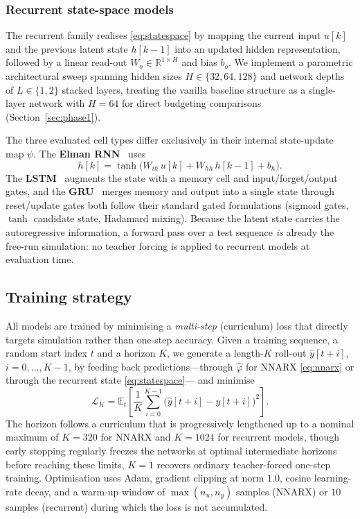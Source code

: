 \documentclass[10pt,twocolumn,letterpaper]{article}
\begin{document}
\subsubsection{Recurrent state-space models}
The recurrent family realises \eqref{eq:statespace} by mapping the current input 
$u[k]$ and the previous latent state $h[k-1]$ into an updated hidden representation, 
followed by a linear read-out $W_o \in \mathbb{R}^{1 \times H}$ and bias $b_o$. 
We implement a parametric architectural sweep 
spanning hidden sizes $H \in \{32, 64, 128\}$ and network depths of $L \in \{1, 2\}$ 
stacked layers, treating the vanilla baseline structure as a single-layer network 
with $H=64$ for direct budgeting comparisons (Section~\ref{sec:phase1}). 

The three evaluated cell types differ exclusively in their internal state-update 
map $\psi$. The \textbf{Elman RNN}~\cite{CourseMaterial} uses
\begin{equation}
    h[k] = \tanh\!\big(W_{ih}\,u[k] + W_{hh}\,h[k-1] + b_h\big).
    \label{eq:rnn}
\end{equation}
The \textbf{LSTM}~\cite{CourseMaterial} augments the state with a memory
cell and input/forget/output gates, and the \textbf{GRU}~\cite{CourseMaterial}
merges memory and output into a single state through reset/update gates
both follow their standard gated formulations (sigmoid gates, $\tanh$
candidate state, Hadamard mixing).
Because the latent state carries the autoregressive information, a
forward pass over a test sequence \emph{is} already the free-run
simulation: no teacher forcing is applied to recurrent models at
evaluation time.

\subsection{Training strategy}\label{sec:training}
All models are trained by minimising a \emph{multi-step} (curriculum)
loss that directly targets simulation rather than one-step accuracy.
Given a training sequence, a random start index $t$ and a horizon $K$,
we generate a length-$K$ roll-out $\hat{y}[t{+}i]$, $i=0,\dots,K-1$, by
feeding back predictions---through $\hat\varphi$ for NNARX
\eqref{eq:nnarx} or through the recurrent state \eqref{eq:statespace}---
and minimise
\begin{equation}
    \mathcal{L}_K
    = \mathbb{E}_{t}\!\left[\frac{1}{K}\sum_{i=0}^{K-1}
      \big(\hat{y}[t{+}i]-y[t{+}i]\big)^2\right].
    \label{eq:loss}
\end{equation}
The horizon follows a curriculum that is progressively lengthened up to a nominal 
maximum of $K=320$ for NNARX and $K=1024$ for recurrent models, though early 
stopping regularly freezes the networks at optimal intermediate horizons before 
reaching these limits, $K=1$ recovers ordinary teacher-forced one-step
training. Optimisation uses Adam, gradient clipping at norm $1.0$, cosine
learning-rate decay, and a warm-up window of $\max(n_u,n_y)$ samples
(NNARX) or $10$ samples (recurrent) during which the loss is not
accumulated.
\end{document}
